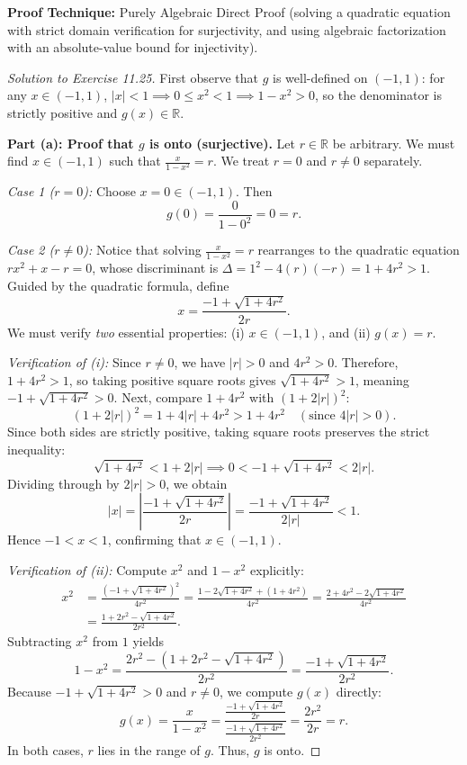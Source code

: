 \documentclass[11pt, letterpaper]{article}
\theoremstyle{definition}
\theoremstyle{remark}
\begin{document}
\medskip
\textbf{Proof Technique:} Purely Algebraic Direct Proof (solving a quadratic equation with strict domain verification for surjectivity, and using algebraic factorization with an absolute-value bound for injectivity).

\begin{proof}[Solution to Exercise 11.25]
First observe that $g$ is well-defined on $(-1, 1)$: for any $x \in (-1, 1)$, $|x| < 1 \implies 0 \le x^2 < 1 \implies 1 - x^2 > 0$, so the denominator is strictly positive and $g(x) \in \mathbb{R}$.

\medskip
\textbf{Part (a): Proof that $g$ is onto (surjective).} Let $r \in \mathbb{R}$ be arbitrary. We must find $x \in (-1, 1)$ such that $\frac{x}{1 - x^2} = r$. We treat $r = 0$ and $r \neq 0$ separately.

\emph{Case 1 ($r = 0$):} Choose $x = 0 \in (-1, 1)$. Then
\[
g(0) = \frac{0}{1 - 0^2} = 0 = r.
\]

\emph{Case 2 ($r \neq 0$):} Notice that solving $\frac{x}{1 - x^2} = r$ rearranges to the quadratic equation $rx^2 + x - r = 0$, whose discriminant is $\Delta = 1^2 - 4(r)(-r) = 1 + 4r^2 > 1$. Guided by the quadratic formula, define
\[
x = \frac{-1 + \sqrt{1 + 4r^2}}{2r}.
\]
We must verify \emph{two} essential properties: (i) $x \in (-1, 1)$, and (ii) $g(x) = r$.

\emph{Verification of (i):} Since $r \neq 0$, we have $|r| > 0$ and $4r^2 > 0$. Therefore, $1 + 4r^2 > 1$, so taking positive square roots gives $\sqrt{1 + 4r^2} > 1$, meaning $-1 + \sqrt{1 + 4r^2} > 0$. Next, compare $1 + 4r^2$ with $(1 + 2|r|)^2$:
\[
(1 + 2|r|)^2 = 1 + 4|r| + 4r^2 > 1 + 4r^2 \quad (\text{since } 4|r| > 0).
\]
Since both sides are strictly positive, taking square roots preserves the strict inequality:
\[
\sqrt{1 + 4r^2} < 1 + 2|r| \implies 0 < -1 + \sqrt{1 + 4r^2} < 2|r|.
\]
Dividing through by $2|r| > 0$, we obtain
\[
|x| = \left|\frac{-1 + \sqrt{1 + 4r^2}}{2r}\right| = \frac{-1 + \sqrt{1 + 4r^2}}{2|r|} < 1.
\]
Hence $-1 < x < 1$, confirming that $x \in (-1, 1)$.

\emph{Verification of (ii):} Compute $x^2$ and $1 - x^2$ explicitly:
\begin{align*}
x^2 &= \frac{\left(-1 + \sqrt{1 + 4r^2}\right)^2}{4r^2} = \frac{1 - 2\sqrt{1 + 4r^2} + (1 + 4r^2)}{4r^2} = \frac{2 + 4r^2 - 2\sqrt{1 + 4r^2}}{4r^2} \\
&= \frac{1 + 2r^2 - \sqrt{1 + 4r^2}}{2r^2}.
\end{align*}
Subtracting $x^2$ from $1$ yields
\[
1 - x^2 = \frac{2r^2 - \left(1 + 2r^2 - \sqrt{1 + 4r^2}\right)}{2r^2} = \frac{-1 + \sqrt{1 + 4r^2}}{2r^2}.
\]
Because $-1 + \sqrt{1 + 4r^2} > 0$ and $r \neq 0$, we compute $g(x)$ directly:
\[
g(x) = \frac{x}{1 - x^2} = \frac{\frac{-1 + \sqrt{1 + 4r^2}}{2r}}{\frac{-1 + \sqrt{1 + 4r^2}}{2r^2}} = \frac{2r^2}{2r} = r.
\]
In both cases, $r$ lies in the range of $g$. Thus, $g$ is onto.


\end{proof}
\end{document}
